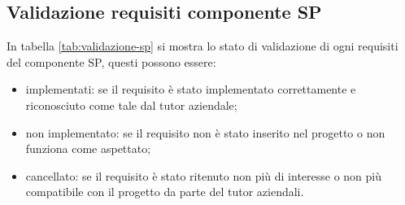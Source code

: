 \subsection{Validazione requisiti componente SP}
In tabella \ref{tab:validazione-sp} si mostra lo stato di validazione di ogni requisiti del componente SP, questi possono essere:
\begin{itemize}
    \item implementati: se il requisito è stato implementato correttamente e riconosciuto come tale dal tutor aziendale;
    \item non implementato: se il requisito non è stato inserito nel progetto o non funziona come aspettato;
    \item cancellato: se il requisito è stato ritenuto non più di interesse o non più compatibile con il progetto da parte del tutor aziendali.
\end{itemize}
